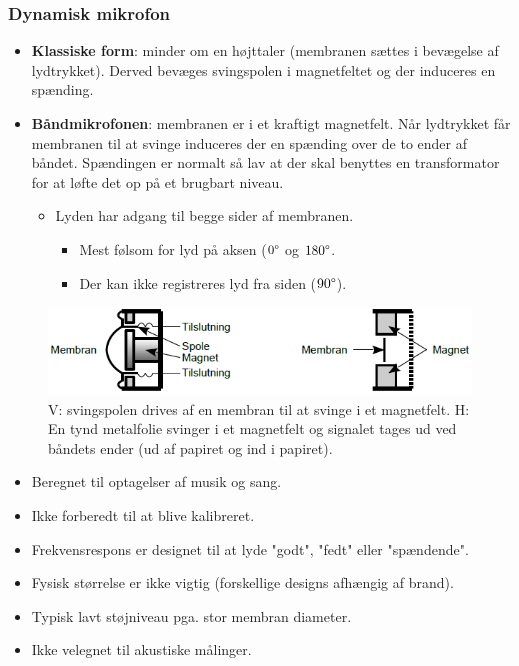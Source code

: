 \subsubsection{Dynamisk mikrofon}
\begin{itemize}
	\item \textbf{Klassiske form}: minder om en højttaler (membranen sættes i bevægelse af lydtrykket). Derved bevæges svingspolen i magnetfeltet
	og der induceres en spænding.
	\item \textbf{Båndmikrofonen}: membranen er i et kraftigt magnetfelt. Når lydtrykket får membranen til at svinge induceres der en spænding over de to ender af båndet. Spændingen er normalt så lav at der skal benyttes en transformator for at løfte det op på et brugbart niveau. 
	\begin{itemize}
		\item Lyden har adgang til begge sider af membranen.
		\begin{itemize}
			\item Mest følsom for lyd på aksen ($0\degree$ og $180\degree$.
			\item Der kan ikke registreres lyd fra siden ($90\degree$).
		\end{itemize}
	\end{itemize} 
\end{itemize}
\begin{figure} [H]
	\centering
	\includegraphics[width=.9\linewidth]{graphics/12.png}
	\caption{V: svingspolen drives af en membran til at svinge i et magnetfelt. H: En tynd metalfolie svinger i et magnetfelt og signalet tages ud ved båndets ender (ud af papiret og ind i papiret).}
	\label{fig:12}
\end{figure}

\begin{itemize}
	\item Beregnet til optagelser af musik og sang.
	\item Ikke forberedt til at blive kalibreret.
	\item Frekvensrespons er designet til at lyde "godt", "fedt" eller "spændende".
	\item Fysisk størrelse er ikke vigtig (forskellige designs afhængig af brand).
	\item Typisk lavt støjniveau pga. stor membran diameter.
	\item Ikke velegnet til akustiske målinger.
\end{itemize}

